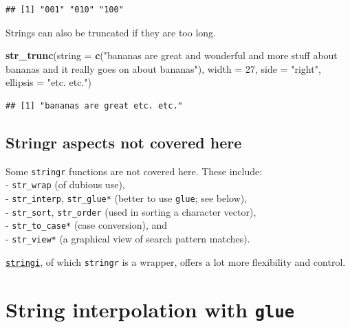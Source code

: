 \documentclass[]{book}
\newenvironment{Shaded}{}{}
\newcommand{\DataTypeTok}[1]{\textcolor[rgb]{0.56,0.13,0.00}{#1}}
\newcommand{\DecValTok}[1]{\textcolor[rgb]{0.25,0.63,0.44}{#1}}
\newcommand{\KeywordTok}[1]{\textcolor[rgb]{0.00,0.44,0.13}{\textbf{#1}}}
\newcommand{\NormalTok}[1]{#1}
\newcommand{\StringTok}[1]{\textcolor[rgb]{0.25,0.44,0.63}{#1}}
\begin{document}
\begin{verbatim}
## [1] "001" "010" "100"
\end{verbatim}

Strings can also be truncated if they are too long.

\begin{Shaded}
\begin{Highlighting}[]
\KeywordTok{str_trunc}\NormalTok{(}\DataTypeTok{string =} \KeywordTok{c}\NormalTok{(}\StringTok{"bananas are great and wonderful }
\StringTok{                     and more stuff about bananas and }
\StringTok{                     it really goes on about bananas"}\NormalTok{),}
          \DataTypeTok{width =} \DecValTok{27}\NormalTok{,}
          \DataTypeTok{side =} \StringTok{"right"}\NormalTok{, }\DataTypeTok{ellipsis =} \StringTok{"etc. etc."}\NormalTok{)}
\end{Highlighting}
\end{Shaded}

\begin{verbatim}
## [1] "bananas are great etc. etc."
\end{verbatim}

\hypertarget{stringr-aspects-not-covered-here}{%
\subsection{Stringr aspects not covered here}\label{stringr-aspects-not-covered-here}}

Some \texttt{stringr} functions are not covered here. These include:\\
- \texttt{str\_wrap} (of dubious use),\\
- \texttt{str\_interp}, \texttt{str\_glue*} (better to use \texttt{glue}; see below),\\
- \texttt{str\_sort}, \texttt{str\_order} (used in sorting a character vector),\\
- \texttt{str\_to\_case*} (case conversion), and\\
- \texttt{str\_view*} (a graphical view of search pattern matches).

\href{https://cran.r-project.org/web/packages/stringi/}{\texttt{stringi}}, of which \texttt{stringr} is a wrapper, offers a lot more flexibility and control.

\hypertarget{string-interpolation-with-glue}{%
\section{\texorpdfstring{String interpolation with \texttt{glue}}{String interpolation with glue}}\label{string-interpolation-with-glue}}
\end{document}
